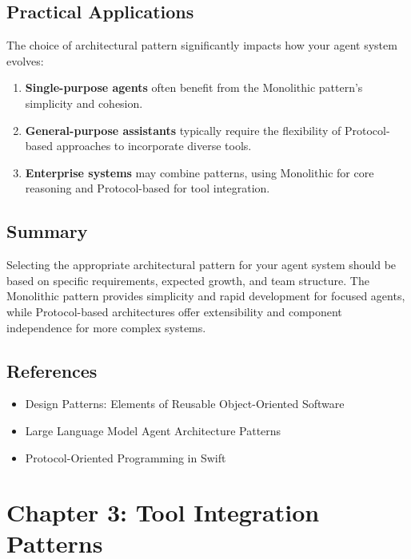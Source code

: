 \documentclass[11pt,oneside]{book}
\providecommand{\tightlist}{%
  \setlength{\itemsep}{0pt}\setlength{\parskip}{0pt}}
\begin{document}
\section{Practical Applications}\label{practical-applications}

The choice of architectural pattern significantly impacts how your agent
system evolves:

\begin{enumerate}
\def\labelenumi{\arabic{enumi}.}
\item
  \textbf{Single-purpose agents} often benefit from the Monolithic
  pattern's simplicity and cohesion.
\item
  \textbf{General-purpose assistants} typically require the flexibility
  of Protocol-based approaches to incorporate diverse tools.
\item
  \textbf{Enterprise systems} may combine patterns, using Monolithic for
  core reasoning and Protocol-based for tool integration.
\end{enumerate}

\section{Summary}\label{summary}

Selecting the appropriate architectural pattern for your agent system
should be based on specific requirements, expected growth, and team
structure. The Monolithic pattern provides simplicity and rapid
development for focused agents, while Protocol-based architectures offer
extensibility and component independence for more complex systems.

\section{References}\label{references-1}

\begin{itemize}
\tightlist
\item
  Design Patterns: Elements of Reusable Object-Oriented Software
\item
  Large Language Model Agent Architecture Patterns
\item
  Protocol-Oriented Programming in Swift
\end{itemize}

\chapter{Chapter 3: Tool Integration
Patterns}\label{chapter-3-tool-integration-patterns}
\end{document}
